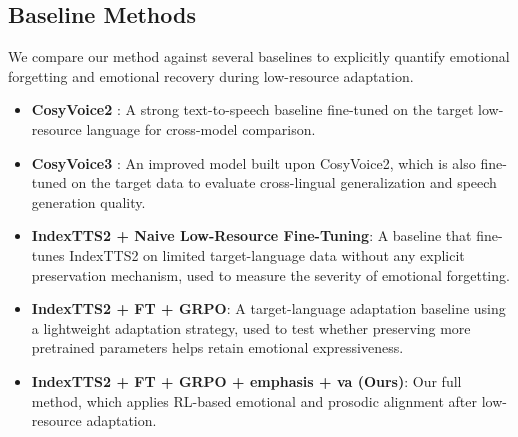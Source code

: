 \subsection{Baseline Methods}
We compare our method against several baselines to explicitly quantify emotional forgetting and emotional recovery during low-resource adaptation.
\begin{itemize}
    \item \textbf{CosyVoice2} \citep{Du2024CosyVoice2S}: A strong text-to-speech baseline fine-tuned on the target low-resource language for cross-model comparison.
    \item \textbf{CosyVoice3} \citep{2025arXiv250517589D}: An improved model built upon CosyVoice2, which is also fine-tuned on the target data to evaluate cross-lingual generalization and speech generation quality.
    \item \textbf{IndexTTS2 + Naive Low-Resource Fine-Tuning}: A baseline that fine-tunes IndexTTS2 on limited target-language data without any explicit preservation mechanism, used to measure the severity of emotional forgetting.
    \item \textbf{IndexTTS2 + FT + GRPO}: A target-language adaptation baseline using a lightweight adaptation strategy, used to test whether preserving more pretrained parameters helps retain emotional expressiveness.
    \item \textbf{IndexTTS2 + FT + GRPO + emphasis + va (Ours)}: Our full method, which applies RL-based emotional and prosodic alignment after low-resource adaptation.
\end{itemize}


